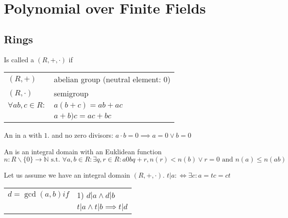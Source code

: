 

\section{Polynomial over Finite Fields}

\subsection{Rings}
\begin{definition}
Is called a  $(R,+,\cdot)$ if
\begin{tabular}{ll}
  $(R,+)$ & abelian group (neutral element: 0)\\
  $(R,\cdot)$ & semigroup \\
  $\forall ab,c \in R:$ & $a(b+c) = ab+ac$\\
                        & $a+b)c = ac+bc$\\
\end{tabular}
\end{definition}

\begin{definition}
An  in a  with $1$. 
and no zero divisors: $a\cdot b = 0 \implies a=0 \lor b = 0$
\end{definition}

\begin{definition}
An  is an integral domain with an Euklidean function
\[
  n: R \backslash \{0\} \rightarrow \mathbb{N} \text{ s.t. }
  \forall a,b \in R: \exists q,r \in R: a 0 bq + r, n(r) < n(b) \lor r=0
  \text{ and } n(a) \leq n(ab)
\]
\end{definition}

Let us assume we have an integral domain $(R,+, \cdot)$. 
$t|a: \Leftrightarrow \exists c: a=tc =ct$
\begin{tabular}{ll}
$d=\gcd(a,b) if$ & 1) $d|a \land d|b$ \\
  & $t|a \land t|b \implies t|d$
\end{tabular}

